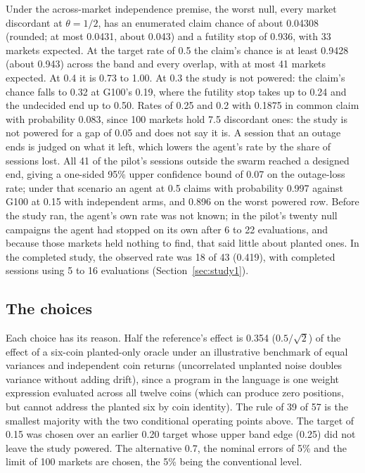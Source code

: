 \documentclass[11pt]{article}
\begin{document}
Under the across-market independence premise, the worst null, every market discordant at $\theta=1/2$, has an enumerated claim chance of about 0.04308 (rounded; at most 0.0431, about 0.043) and a futility stop of 0.936, with 33 markets expected. At the target rate of 0.5 the claim's chance is at least 0.9428 (about 0.943) across the band and every overlap, with at most 41 markets expected. At 0.4 it is 0.73 to 1.00. At 0.3 the study is not powered: the claim's chance falls to 0.32 at G100's 0.19, where the futility stop takes up to 0.24 and the undecided end up to 0.50. Rates of 0.25 and 0.2 with 0.1875 in common claim with probability 0.083, since 100 markets hold 7.5 discordant ones: the study is not powered for a gap of 0.05 and does not say it is. A session that an outage ends is judged on what it left, which lowers the agent's rate by the share of sessions lost. All 41 of the pilot's sessions outside the swarm reached a designed end, giving a one-sided 95\% upper confidence bound of 0.07 on the outage-loss rate; under that scenario an agent at 0.5 claims with probability 0.997 against G100 at 0.15 with independent arms, and 0.896 on the worst powered row. Before the study ran, the agent's own rate was not known; in the pilot's twenty null campaigns the agent had stopped on its own after 6 to 22 evaluations, and because those markets held nothing to find, that said little about planted ones. In the completed study, the observed rate was 18 of 43 (0.419), with completed sessions using 5 to 16 evaluations (Section~\ref{sec:study1}).

\subsection{The choices}\label{app:s1choices}

Each choice has its reason. Half the reference's effect is 0.354 ($0.5/\sqrt2$) of the effect of a six-coin planted-only oracle under an illustrative benchmark of equal variances and independent coin returns (uncorrelated unplanted noise doubles variance without adding drift), since a program in the language is one weight expression evaluated across all twelve coins (which can produce zero positions, but cannot address the planted six by coin identity). The rule of 39 of 57 is the smallest majority with the two conditional operating points above. The target of 0.15 was chosen over an earlier 0.20 target whose upper band edge (0.25) did not leave the study powered. The alternative 0.7, the nominal errors of 5\% and the limit of 100 markets are chosen, the 5\% being the conventional level.
\end{document}
